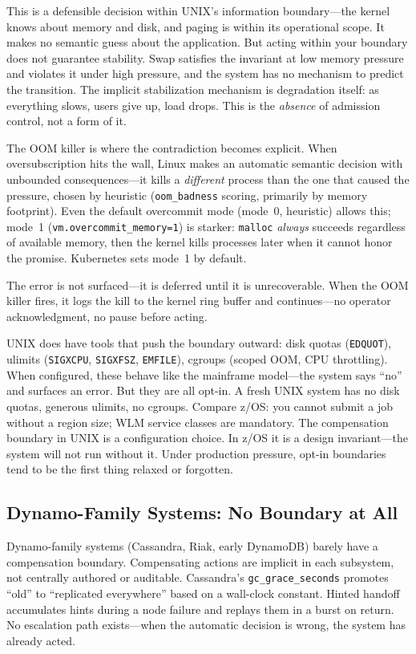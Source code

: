 \documentclass[11pt]{article}
\begin{document}
This is a defensible decision within UNIX's information boundary---the kernel
knows about memory and disk, and paging is within its operational scope. It makes
no semantic guess about the application. But acting within your boundary does not
guarantee stability. Swap satisfies the invariant at low memory pressure and
violates it under high pressure, and the system has no mechanism to predict the
transition. The implicit stabilization mechanism is degradation itself: as
everything slows, users give up, load drops. This is the \emph{absence} of
admission control, not a form of it.

The OOM killer is where the contradiction becomes explicit. When oversubscription
hits the wall, Linux makes an automatic semantic decision with unbounded
consequences---it kills a \emph{different} process than the one that caused the
pressure, chosen by heuristic (\texttt{oom\_badness} scoring, primarily by
memory footprint). Even the default overcommit mode (mode~0, heuristic) allows
this; mode~1 (\texttt{vm.overcommit\_memory=1}) is starker: \texttt{malloc}
\emph{always} succeeds regardless of available memory, then the kernel kills
processes later when it cannot honor the promise. Kubernetes sets mode~1 by
default.

The error is not surfaced---it is deferred until it is unrecoverable. When the
OOM killer fires, it logs the kill to the kernel ring buffer and
continues---no operator acknowledgment, no pause before acting.

UNIX does have tools that push the boundary outward: disk quotas
(\texttt{EDQUOT}), ulimits (\texttt{SIGXCPU}, \texttt{SIGXFSZ},
\texttt{EMFILE}), cgroups (scoped OOM, CPU throttling). When configured, these
behave like the mainframe model---the system says ``no'' and surfaces an error.
But they are all opt-in. A fresh UNIX system has no disk quotas, generous
ulimits, no cgroups. Compare z/OS: you cannot submit a job without a region
size; WLM service classes are mandatory. The compensation boundary in UNIX is a
configuration choice. In z/OS it is a design invariant---the system will not run
without it. Under production pressure, opt-in boundaries tend to be the first
thing relaxed or forgotten.

\subsection{Dynamo-Family Systems: No Boundary at All}

Dynamo-family systems (Cassandra, Riak, early DynamoDB) barely have a
compensation boundary. Compensating actions are implicit in each subsystem, not
centrally authored or auditable. Cassandra's \texttt{gc\_grace\_seconds} promotes
``old'' to ``replicated everywhere'' based on a wall-clock constant. Hinted
handoff accumulates hints during a node failure and replays them in a burst on
return. No escalation path exists---when the automatic decision is wrong, the
system has already acted.
\end{document}
